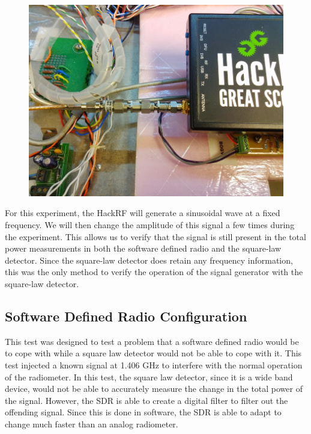 \begin{figure}[h!tb] \centering

\includegraphics[width=\textwidth]{Images/Hack_RF.jpg}
\label{HackRF}
\end{figure} 

For this experiment, the HackRF will generate a sinusoidal wave at a fixed frequency.  We will then change the amplitude of this signal a few times during the experiment.  This allows us to verify that the signal is still present in the total power measurements in both the software defined radio and the square-law detector.  Since the square-law detector does retain any frequency information, this was the only method to verify the operation of the signal generator with the square-law detector.   

\subsection{Software Defined Radio Configuration}

This test was designed to test a problem that a software defined radio would be to cope with while a square law detector would not be able to cope with it.  This test injected a known signal at 1.406 GHz to interfere with the normal operation of the radiometer.  In this test, the square law detector, since it is a wide band device, would not be able to accurately measure the change in the total power of the signal.  However, the SDR is able to create a digital filter to filter out the offending signal.  Since this is done in software, the SDR is able to adapt to change much faster than an analog radiometer.


